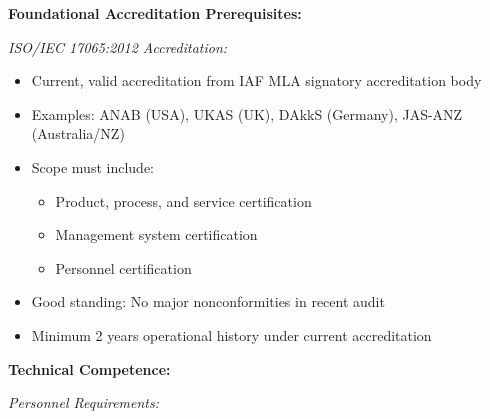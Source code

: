 \documentclass[11pt,a4paper]{article}
\begin{document}
\textbf{Foundational Accreditation Prerequisites:}

\textit{ISO/IEC 17065:2012 Accreditation:}
\begin{itemize}
\item Current, valid accreditation from IAF MLA signatory accreditation body
\item Examples: ANAB (USA), UKAS (UK), DAkkS (Germany), JAS-ANZ (Australia/NZ)
\item Scope must include:
\begin{itemize}
\item Product, process, and service certification
\item Management system certification
\item Personnel certification
\end{itemize}
\item Good standing: No major nonconformities in recent audit
\item Minimum 2 years operational history under current accreditation
\end{itemize}

\textbf{Technical Competence:}

\textit{Personnel Requirements:}
\end{document}
